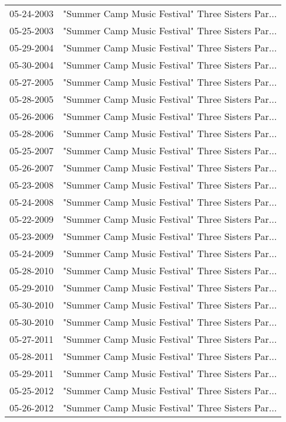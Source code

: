 \begin{supertabular}{ll}
 05-24-2003 &  "Summer Camp Music Festival" Three Sisters Par... \\
 05-25-2003 &  "Summer Camp Music Festival" Three Sisters Par... \\
 05-29-2004 &  "Summer Camp Music Festival" Three Sisters Par... \\
 05-30-2004 &  "Summer Camp Music Festival" Three Sisters Par... \\
 05-27-2005 &  "Summer Camp Music Festival" Three Sisters Par... \\
 05-28-2005 &  "Summer Camp Music Festival" Three Sisters Par... \\
 05-26-2006 &  "Summer Camp Music Festival" Three Sisters Par... \\
 05-28-2006 &  "Summer Camp Music Festival" Three Sisters Par... \\
 05-25-2007 &  "Summer Camp Music Festival" Three Sisters Par... \\
 05-26-2007 &  "Summer Camp Music Festival" Three Sisters Par... \\
 05-23-2008 &  "Summer Camp Music Festival" Three Sisters Par... \\
 05-24-2008 &  "Summer Camp Music Festival" Three Sisters Par... \\
 05-22-2009 &  "Summer Camp Music Festival" Three Sisters Par... \\
 05-23-2009 &  "Summer Camp Music Festival" Three Sisters Par... \\
 05-24-2009 &  "Summer Camp Music Festival" Three Sisters Par... \\
 05-28-2010 &  "Summer Camp Music Festival" Three Sisters Par... \\
 05-29-2010 &  "Summer Camp Music Festival" Three Sisters Par... \\
 05-30-2010 &  "Summer Camp Music Festival" Three Sisters Par... \\
 05-30-2010 &  "Summer Camp Music Festival" Three Sisters Par... \\
 05-27-2011 &  "Summer Camp Music Festival" Three Sisters Par... \\
 05-28-2011 &  "Summer Camp Music Festival" Three Sisters Par... \\
 05-29-2011 &  "Summer Camp Music Festival" Three Sisters Par... \\
 05-25-2012 &  "Summer Camp Music Festival" Three Sisters Par... \\
 05-26-2012 &  "Summer Camp Music Festival" Three Sisters Par... \\

\end{supertabular}
